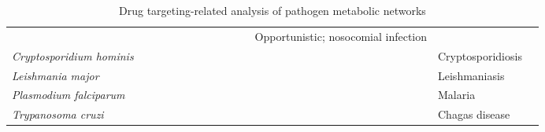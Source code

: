 \begin{sidewaystable*}
\begin{center}
\begin{tabular}{ l  c  c  c  c  c  c  c  c | c  c | c l l }
     \cellcolor[gray]{0.8} & \cellcolor[gray]{0.8} & & \cellcolor[gray]{0.8} & 
     & & & & \cellcolor[gray]{0.8} & & 
     & Opportunistic; nosocomial infection & \cite{Navid:2009en} \\ \cline{2-12}
\textit{Cryptosporidium hominis} & 
     \cellcolor[gray]{0.8} & & & & 
     & & & & \cellcolor[gray]{0.8} & & 
     & Cryptosporidiosis & \cite{Vanee:2010du} \\ \cline{2-12}
\textit{Leishmania major} & 
     \cellcolor[gray]{0.8} & \cellcolor[gray]{0.8} & & \cellcolor[gray]{0.8} & 
     & \cellcolor[gray]{0.8} & & & \cellcolor[gray]{0.8} & & 
     & Leishmaniasis & \cite{Chavali:2008gh} \\ \cline{2-12}
\textit{Plasmodium falciparum} & 
     \cellcolor[gray]{0.8} & & & \cellcolor[gray]{0.8} & 
     & & & & \cellcolor[gray]{0.8} & \cellcolor[gray]{0.8} & \cellcolor[gray]{0.8}
     & Malaria & \cite{Huthmacher:2010hi,Plata:2010dw} \\ \cline{2-12}
\textit{Trypanosoma cruzi} & 
     \cellcolor[gray]{0.8} & & & & \cellcolor[gray]{0.8}
     & & & & \cellcolor[gray]{0.8} & &
     & Chagas disease & \cite{Roberts:2009dl} \\ %
\end{tabular}
\caption[Drug targeting-related analysis of pathogen metabolic networks]{
          Drug targeting-related analysis of pathogen metabolic networks}
\label{trends:table1}
\end{center}
\end{sidewaystable*}